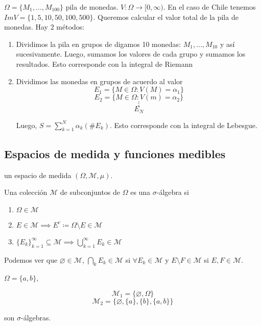 $\Omega = \{M_1,\ldots,M_{100}\}$ pila de monedas. $V:\Omega\to [0,\infty)$. En el caso de Chile tenemos $Im V=\{1,5,10,50,100,500\}$. Queremos calcular el valor total de la pila de monedas. Hay 2 métodos:

\begin{enumerate}
    \item Dividimos la pila en grupos de digamos 10 monedas: $M_1,\ldots,M_{10}$ y así sucesivamente. Luego, sumamos los valores de cada grupo y sumamos los resultados. Esto corresponde con la integral de Riemann
    \item Dividimos las monedas en grupos de acuerdo al valor 
    \[E_1=\{M\in\Omega:V(M)=\alpha_1\}\]
    \[E_2=\{M\in\Omega: V(m)=\alpha_2\}\]
    \[\vdots\]
    \[E_N\]

    Luego, $S=\displaystyle\sum_{k=1}^N \alpha_k (\# E_k)$. Esto corresponde con la integral de Lebesgue.
\end{enumerate}

\subsection{Espacios de medida y funciones medibles}

\begin{fdefinition}
    un espacio de medida $(\Omega, \mathcal{M}, \mu)$.
\end{fdefinition}

\begin{fdefinition}
    Una colección $\mathcal{M}$ de subconjuntos de $\Omega$ es una $\sigma$-álgebra si

    \begin{enumerate}
        \item $\Omega\in \mathcal{M}$
        \item $E\in \mathcal{M}\implies E^c\coloneqq \Omega\setminus E\in \mathcal{M}$
        \item $\{E_k\}_{k=1}^\infty\subseteq \mathcal{M}\implies \bigcup_{k=1}^\infty E_k\in\mathcal{M}$
    \end{enumerate}
\end{fdefinition}

Podemos ver que $\varnothing\in \mathcal{M}$, $\bigcap_{k} E_k\in\mathcal{M}$ si $\forall E_k\in\mathcal{M}$ y $E\setminus F\in\mathcal{M}$ si $E,F\in\mathcal{M}$.

\begin{fexample}
    $\Omega=\{a,b\}$,

    \[\mathcal{M}_1=\{\varnothing,\Omega\}\]
    \[\mathcal{M}_2=\{\varnothing, \{a\},\{b\},\{a,b\}\}\]

    son $\sigma$-álgebras.
\end{fexample}

